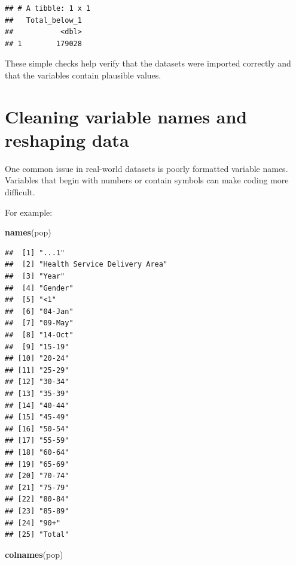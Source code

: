 \documentclass[
  11pt,
  oneside]{book}
\newenvironment{Shaded}{\begin{snugshade}}{\end{snugshade}}
\newcommand{\FunctionTok}[1]{\textcolor[rgb]{0.13,0.29,0.53}{\textbf{#1}}}
\newcommand{\NormalTok}[1]{#1}
\begin{document}
\begin{verbatim}
## # A tibble: 1 x 1
##   Total_below_1
##           <dbl>
## 1        179028
\end{verbatim}

These simple checks help verify that the datasets were imported correctly and that the variables contain plausible values.

\section{Cleaning variable names and reshaping data}\label{cleaning-variable-names-and-reshaping-data}

One common issue in real-world datasets is poorly formatted variable names. Variables that begin with numbers or contain symbols can make coding more difficult.

For example:

\begin{Shaded}
\begin{Highlighting}[]
\FunctionTok{names}\NormalTok{(pop)}
\end{Highlighting}
\end{Shaded}

\begin{verbatim}
##  [1] "...1"                        
##  [2] "Health Service Delivery Area"
##  [3] "Year"                        
##  [4] "Gender"                      
##  [5] "<1"                          
##  [6] "04-Jan"                      
##  [7] "09-May"                      
##  [8] "14-Oct"                      
##  [9] "15-19"                       
## [10] "20-24"                       
## [11] "25-29"                       
## [12] "30-34"                       
## [13] "35-39"                       
## [14] "40-44"                       
## [15] "45-49"                       
## [16] "50-54"                       
## [17] "55-59"                       
## [18] "60-64"                       
## [19] "65-69"                       
## [20] "70-74"                       
## [21] "75-79"                       
## [22] "80-84"                       
## [23] "85-89"                       
## [24] "90+"                         
## [25] "Total"
\end{verbatim}

\begin{Shaded}
\begin{Highlighting}[]
\FunctionTok{colnames}\NormalTok{(pop)}
\end{Highlighting}
\end{Shaded}
\end{document}

